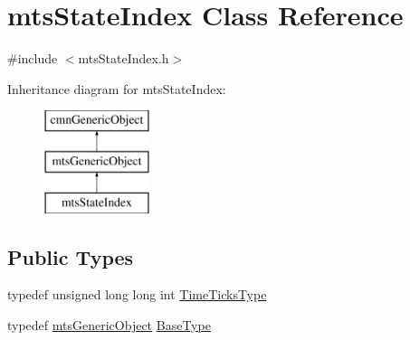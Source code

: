 \hypertarget{classmts_state_index}{\section{mts\-State\-Index Class Reference}
\label{classmts_state_index}
}


{\ttfamily \#include $<$mts\-State\-Index.\-h$>$}

Inheritance diagram for mts\-State\-Index\-:\begin{figure}[H]
\begin{center}
\leavevmode
\includegraphics[height=3.000000cm]{d2/d0a/classmts_state_index}
\end{center}
\end{figure}
\subsection*{Public Types}
\begin{DoxyCompactItemize}
\item 
typedef unsigned long long int \hyperlink{classmts_state_index_a80d0a5acdec3b616347ddea2912b6294}{Time\-Ticks\-Type}
\item 
typedef \hyperlink{classmts_generic_object}{mts\-Generic\-Object} \hyperlink{classmts_state_index_a9b228c6cd3d48921c5253fd6b1a95800}{Base\-Type}
\end{DoxyCompactItemize}
